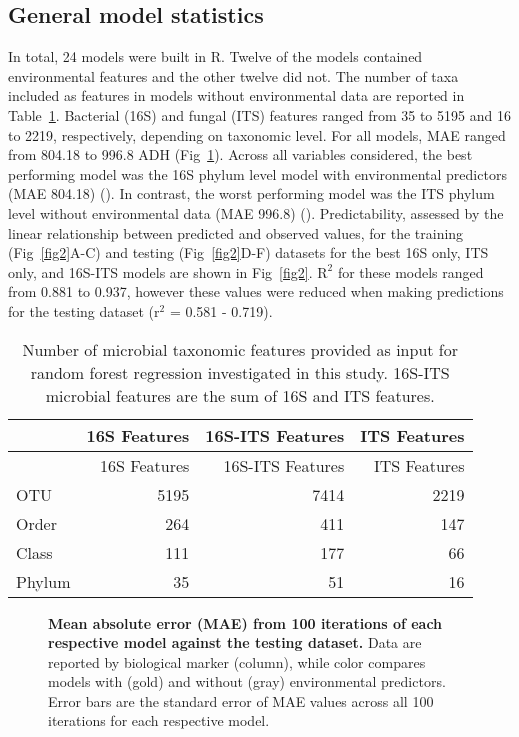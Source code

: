 \documentclass[
  10pt,
  letterpaper,
]{article}
\begin{document}
\hypertarget{general-model-statistics}{%
\subsection{General model statistics}\label{general-model-statistics}}

In total, 24 models were built in R. Twelve of the models contained
environmental features and the other twelve did not. The number of taxa
included as features in models without environmental data are reported
in Table~\ref{tbl-numfeatures}. Bacterial (16S) and fungal (ITS)
features ranged from 35 to 5195 and 16 to 2219, respectively, depending
on taxonomic level. For all models, MAE ranged from 804.18 to 996.8 ADH
(Fig~\ref{fig1}). Across all variables considered, the best performing
model was the 16S phylum level model with environmental predictors (MAE
804.18) (). In contrast, the worst performing model
was the ITS phylum level without environmental data (MAE 996.8)
(). Predictability, assessed by the linear
relationship between predicted and observed values, for the training
(Fig~\ref{fig2}A-C) and testing (Fig~\ref{fig2}D-F) datasets for the
best 16S only, ITS only, and 16S-ITS models are shown in Fig~\ref{fig2}.
\(\mathrm{R}^2\) for these models ranged from 0.881 to 0.937, however
these values were reduced when making predictions for the testing
dataset (\(\mathrm{r}^2\) = 0.581 - 0.719).

\hypertarget{tbl-numfeatures}{}
\begin{longtable}[]{@{}lrrr@{}}
\caption{\label{tbl-numfeatures}Number of microbial taxonomic features
provided as input for random forest regression investigated in this
study. 16S-ITS microbial features are the sum of 16S and ITS
features.}\tabularnewline
\toprule\noalign{}
& 16S Features & 16S-ITS Features & ITS Features \\
\midrule\noalign{}
\endfirsthead
\toprule\noalign{}
& 16S Features & 16S-ITS Features & ITS Features \\
\midrule\noalign{}
\endhead
\bottomrule\noalign{}
\endlastfoot
OTU & 5195 & 7414 & 2219 \\
Order & 264 & 411 & 147 \\
Class & 111 & 177 & 66 \\
Phylum & 35 & 51 & 16 \\
\end{longtable}

\begin{figure}[!h]
\caption{{\bf Mean absolute error (MAE) from 100 iterations of each respective model against the testing dataset.}
Data are reported by biological marker (column), while color compares models with (gold) and without (gray) environmental predictors. Error bars are the standard error of MAE values across all 100 iterations for each respective model.}
\label{fig1}
\end{figure}
\end{document}
